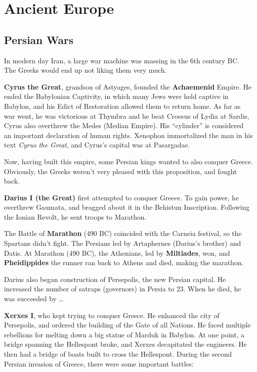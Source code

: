 \chapter{Ancient Europe}

\section{Persian Wars}

In modern day Iran, a large war machine was massing in the 6th century BC\@.
The Greeks would end up not liking them very much.

\textbf{Cyrus the Great}, grandson of Astyages, founded the \textbf{Achaemenid} Empire.
He ended the Babylonian Captivity, in which many Jews were held captive in Babylon,
and his Edict of Restoration allowed them to return home.
As far as war went, he was victorious at Thymbra and he beat Croesus of Lydia at Sardis,
Cyrus also overthrew the Medes (Median Empire).
His ``cylinder'' is considered an important declaration of human rights.
Xenophon immortalized the man in his text \textit{Cyrus the Great}, and Cyrus's capital was at Pasargadae.

Now, having built this empire, some Persian kings wanted to also conquer Greece.
Obviously, the Greeks weren't very pleased with this proposition, and fought back.

\textbf{Darius I (the Great)} first attempted to conquer Greece.
To gain power, he overthrew Gaumata, and bragged about it in the Behistun Inscription.
Following the Ionian Revolt, he sent troops to Marathon.

The Battle of \textbf{Marathon} (490 BC) coincided with the Carneia festival, so the Spartans didn't fight.
The Persians led by Artaphernes (Darius's brother) and Datis.
At Marathon (490 BC), the Athenians, led by \textbf{Miltiades}, won,
and \textbf{Pheidippides} the runner ran back to Athens and died, making the marathon.

Darius also began construction of Persepolis, the new Persian capital.
He increased the number of satraps (governors) in Persia to 23.
When he died, he was succeeded by \ldots

\textbf{Xerxes I}, who kept trying to conquer Greece.
He enhanced the city of Persepolis, and ordered the building of the Gate of all Nations.
He faced multiple rebellions for melting down a big statue of Marduk in Babylon.
At one point, a bridge spanning the Hellespont broke, and Xerxes decapitated the engineers.
He then had a bridge of boats built to cross the Hellespont.
During the second Persian invasion of Greece, there were some important battles:

